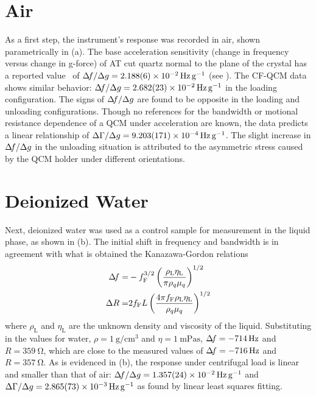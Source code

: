 \section{Air}
As a first step, the instrument's response was recorded in air, shown
parametrically in (a).  The base acceleration
sensitivity (change in frequency versus change in g-force) of AT cut quartz
normal to the plane of the crystal has a reported
value~\cite{valdois2794influence} of $\df/\Delta g
=\SI{2.188+-0.006e-2}{\hertz\per\g}$ (see
).  The CF-QCM data shows similar
behavior: $\df/\Delta g =\SI{2.682+-0.023e-2}{\hertz\per\g}$ in the loading
configuration.  The signs of $\Delta\!f/\Delta g$ are found to be opposite in the
loading and unloading configurations.  Though no references for
the bandwidth or motional resistance dependence of a QCM under
acceleration are known, the data predicts a linear relationship of $\dg/\Delta g =
\SI{9.203+-0.171e-4}{\hertz\per\g}$.  The slight increase in $\Delta\!f/\Delta g$
in the unloading situation is attributed to the asymmetric stress caused by
the QCM holder under different orientations.

\section{Deionized Water}
Next, deionized water was used as a control sample for measurement in the
liquid phase, as shown in (b).  The initial shift in
frequency and bandwidth is in agreement with what is obtained the
Kanazawa-Gordon relations~\cite{kanazawa1985frequency} 
\begin{align}
\Delta\!f=&-f_{\text{F}}^{3/2}\left(\frac{\rho_{\text{L}}\eta_{\text{L}}}{\pi\rho_{q}\mu_{q}}\right)^{1/2}\\
\Delta R=&2f_{\text{F}}L\left(\frac{4\pi
 f_{\text{F}}\rho_{\text{L}}\eta_{\text{L}}}{\rho_{q}\mu_{q}}\right)^{1/2}
\end{align}
where $\rho_{\text{L}}$ and $\eta_{\text{L}}$ are the unknown density and
viscosity of the liquid.   Substituting in the values for water,
$\rho=\SI{1}{\gram\per\centi\meter\cubed}$ and
$\eta=\SI{1}{\milli\pascal\second}$, $\Delta\!f = \SI{-714}{\hertz}$ and
$R=\SI{359}{\ohm}$, which are close to the measured values of $\Delta\!f =
\SI{-716}{\hertz}$ and $R=\SI{357}{\ohm}$.  As is evidenced in
(b), the response under centrifugal
load is linear and smaller than that of air: $\df/\Delta g=
\SI{1.357+-0.024e-2}{\hertz \per\g}$ and $\dg/\Delta g=
\SI{2.865+-0.073e-3}{\hertz\per\g}$ as found by linear least squares fitting.  

